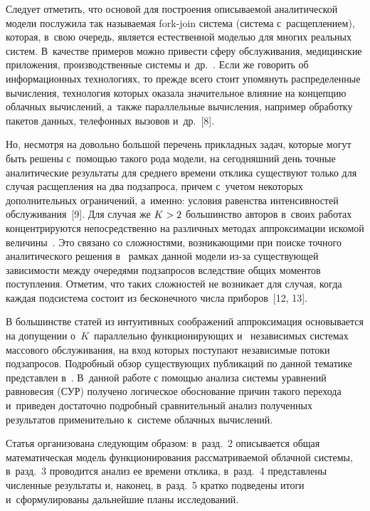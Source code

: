 \begin{multicols}{2}
  Следует отметить, что основой для построения описываемой аналитической 
модели послужила так называемая fork-join система (система с~расщеплением), 
которая, в~свою очередь, является естественной моделью для многих реальных 
систем. В~качестве примеров можно привести сферу обслуживания, 
медицинские приложения, производственные системы и~др.~\cite{7-gor}. Если 
же говорить об информационных технологиях, то прежде всего стоит 
упомянуть распределенные вычисления, технология которых оказала 
значительное влияние на концепцию облачных вычислений, а~также 
параллельные вычисления, например обработку пакетов данных, телефонных 
вызовов и~др.~[8].
  
  Но, несмотря на довольно большой перечень прикладных задач, которые 
могут быть решены с~помощью такого рода модели, на сегодняшний день 
точные аналитические результаты для среднего времени отклика существуют 
только для случая расщепления на два подзапроса, причем с~учетом некоторых 
дополнительных ограничений, а~именно: условия равенства интенсивностей 
обслуживания~[9]. Для случая же $K\hm>2$ большинство авторов в~своих 
работах концентрируются непосредственно на различных методах 
аппроксимации искомой величины~\cite{7-gor, 10-gor, 11-gor}. Это связано со 
сложностями, возникающими при поиске точного аналитического решения в~
рамках данной модели из-за существующей зависимости между очередями 
подзапросов вследствие общих моментов поступления. Отметим, что таких 
сложностей не возникает для случая, когда каждая подсистема состоит из 
бесконечного числа приборов~[12, 13].
  
  В большинстве статей из интуитивных соображений аппроксимация 
основывается на допущении о~$K$~параллельно функционирующих и~
независимых системах массового обслуживания, на вход которых поступают 
независимые потоки подзапросов. Подробный обзор существующих 
публикаций по данной тематике представлен в~\cite{14-gor}. В~данной работе 
с помощью анализа системы уравнений равновесия (СУР) получено логическое 
обоснование причин такого перехода и~приведен достаточно подробный 
сравнительный анализ полученных результатов применительно к~системе 
облачных вычислений.
  
  Статья организована следующим образом: в~разд.~2 описывается общая 
математическая модель функционирования рассматриваемой облачной 
системы, в~разд.~3 проводится анализ ее времени отклика, в~разд.~4 
представлены численные результаты и, наконец, в~разд.~5 кратко подведены 
итоги и~сформулированы дальнейшие планы исследований.


\end{multicols}
